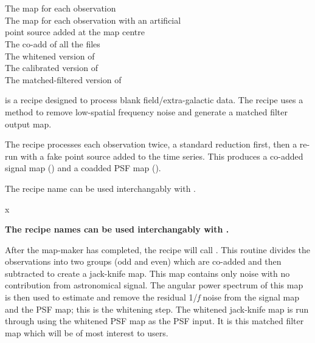 \documentclass[11pt,oneside,chapters]{starlink}
\begin{document}
\begin{minipage}[t]{0.3\linewidth}
\\\\
\end{minipage}
\begin{minipage}[t]{0.7\linewidth}
The map for each observation\\
The map for each observation with an artificial\\point source added at the map centre\\
The co-add of all the  files\\
The whitened version of \\
The calibrated version of \\
The matched-filtered version of \\
\end{minipage}

 is a recipe designed to
process blank field/extra-galactic data. The recipe uses a
method to remove low-spatial frequency noise and generate a matched
filter output map.

The recipe processes each observation twice, a standard reduction
first, then a re-run with a fake point source added to the time
series. This produces a co-added signal map () and a
coadded PSF map ().

\begin{tip}
The recipe name  can be used
interchangably with  .
\end{tip}x

\begin{htmlonly}
\textbf{The recipe names  can be
used interchangably with  .}
\end{htmlonly}

After the map-maker has completed, the recipe will call
. This
routine divides the observations into two groups (odd and even) which
are co-added and then subtracted to create a jack-knife map. This map
contains only noise with no contribution from astronomical signal. The
angular power spectrum of this map is then used to estimate and remove
the residual 1/\emph{f} noise from the signal map and the PSF map;
this is the whitening step. The whitened jack-knife map is run through
using the whitened PSF map as the PSF input. It is this matched filter
map which will be of most interest to users.
\end{document}
